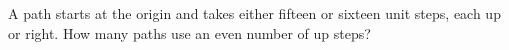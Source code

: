 A path starts at the origin and takes either fifteen or sixteen unit steps, each up or right. How many paths use an even number of up steps?
